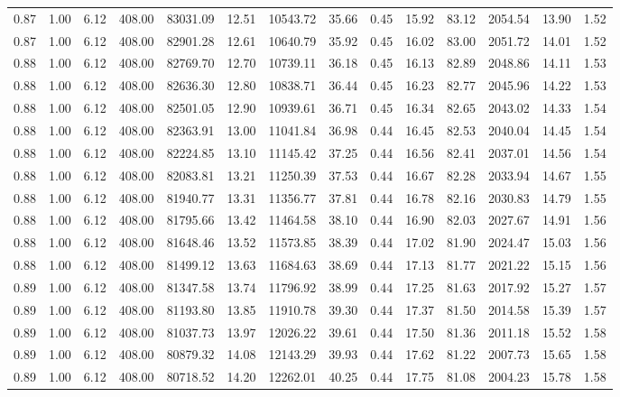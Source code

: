 \begin{table}[!ht]
\begin{tabular}{rrrrrrrrrrrrrr}
0.87 & 1.00 & 6.12 & 408.00 & 83031.09 & 12.51 & 10543.72 & 35.66 & 0.45 & 15.92 & 83.12 & 2054.54 & 13.90 & 1.52 \\
0.87 & 1.00 & 6.12 & 408.00 & 82901.28 & 12.61 & 10640.79 & 35.92 & 0.45 & 16.02 & 83.00 & 2051.72 & 14.01 & 1.52 \\
0.88 & 1.00 & 6.12 & 408.00 & 82769.70 & 12.70 & 10739.11 & 36.18 & 0.45 & 16.13 & 82.89 & 2048.86 & 14.11 & 1.53 \\
0.88 & 1.00 & 6.12 & 408.00 & 82636.30 & 12.80 & 10838.71 & 36.44 & 0.45 & 16.23 & 82.77 & 2045.96 & 14.22 & 1.53 \\
0.88 & 1.00 & 6.12 & 408.00 & 82501.05 & 12.90 & 10939.61 & 36.71 & 0.45 & 16.34 & 82.65 & 2043.02 & 14.33 & 1.54 \\
0.88 & 1.00 & 6.12 & 408.00 & 82363.91 & 13.00 & 11041.84 & 36.98 & 0.44 & 16.45 & 82.53 & 2040.04 & 14.45 & 1.54 \\
0.88 & 1.00 & 6.12 & 408.00 & 82224.85 & 13.10 & 11145.42 & 37.25 & 0.44 & 16.56 & 82.41 & 2037.01 & 14.56 & 1.54 \\
0.88 & 1.00 & 6.12 & 408.00 & 82083.81 & 13.21 & 11250.39 & 37.53 & 0.44 & 16.67 & 82.28 & 2033.94 & 14.67 & 1.55 \\
0.88 & 1.00 & 6.12 & 408.00 & 81940.77 & 13.31 & 11356.77 & 37.81 & 0.44 & 16.78 & 82.16 & 2030.83 & 14.79 & 1.55 \\
0.88 & 1.00 & 6.12 & 408.00 & 81795.66 & 13.42 & 11464.58 & 38.10 & 0.44 & 16.90 & 82.03 & 2027.67 & 14.91 & 1.56 \\
0.88 & 1.00 & 6.12 & 408.00 & 81648.46 & 13.52 & 11573.85 & 38.39 & 0.44 & 17.02 & 81.90 & 2024.47 & 15.03 & 1.56 \\
0.88 & 1.00 & 6.12 & 408.00 & 81499.12 & 13.63 & 11684.63 & 38.69 & 0.44 & 17.13 & 81.77 & 2021.22 & 15.15 & 1.56 \\
0.89 & 1.00 & 6.12 & 408.00 & 81347.58 & 13.74 & 11796.92 & 38.99 & 0.44 & 17.25 & 81.63 & 2017.92 & 15.27 & 1.57 \\
0.89 & 1.00 & 6.12 & 408.00 & 81193.80 & 13.85 & 11910.78 & 39.30 & 0.44 & 17.37 & 81.50 & 2014.58 & 15.39 & 1.57 \\
0.89 & 1.00 & 6.12 & 408.00 & 81037.73 & 13.97 & 12026.22 & 39.61 & 0.44 & 17.50 & 81.36 & 2011.18 & 15.52 & 1.58 \\
0.89 & 1.00 & 6.12 & 408.00 & 80879.32 & 14.08 & 12143.29 & 39.93 & 0.44 & 17.62 & 81.22 & 2007.73 & 15.65 & 1.58 \\
0.89 & 1.00 & 6.12 & 408.00 & 80718.52 & 14.20 & 12262.01 & 40.25 & 0.44 & 17.75 & 81.08 & 2004.23 & 15.78 & 1.58 \\

\end{tabular}
\end{table}
